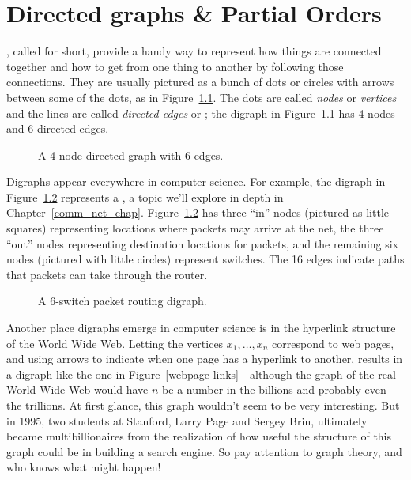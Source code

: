\chapter{Directed graphs \& Partial Orders}\label{digraphs_chap}

, called  for short, provide a
handy way to represent how things are connected together and how to
get from one thing to another by following those connections.  They are
usually pictured as a bunch of dots or circles with arrows between
some of the dots, as in Figure~\ref{fig:4N6E}.  The dots are called
\emph{nodes} or \emph{vertices} and the lines are called
\emph{directed edges} or ; the digraph in
Figure~\ref{fig:4N6E} has 4 nodes and 6 directed edges.

\begin{figure}


\caption{A 4-node directed graph with 6 edges.}

\label{fig:4N6E}

\end{figure}

Digraphs appear everywhere in computer science.  For example, the
digraph in Figure~\ref{fig:6switchnet} represents a , a topic we'll explore in depth in Chapter~\ref{comm_net_chap}.
Figure~\ref{fig:6switchnet} has three ``in'' nodes (pictured as little
squares) representing locations where packets may arrive at the net,
the three ``out'' nodes representing destination locations for
packets, and the remaining six nodes (pictured with little circles)
represent switches.  The 16 edges indicate paths that packets can take
through the router.

\begin{figure}


\caption{A 6-switch packet routing digraph.}

\label{fig:6switchnet}
\end{figure}

Another place digraphs emerge in computer science is in the hyperlink
structure of the World Wide Web.  Letting the vertices $x_1, \dots,
x_n$ correspond to web pages, and using arrows to indicate when one
page has a hyperlink to another, results in a digraph like the one in
Figure~\ref{webpage-links}---although the graph of the real World Wide
Web would have $n$ be a number in the billions and probably even the
trillions.  At first glance, this graph wouldn't seem to be very
interesting.  But in 1995, two students at Stanford,  Larry Page and  Sergey Brin, ultimately
became multibillionaires from the realization of how useful the
structure of this graph could be in building a search engine.  So pay
attention to graph theory, and who knows what might happen!

